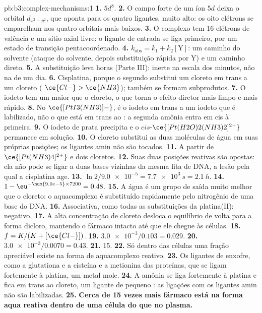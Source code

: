 \begin{solution}{pb:b3:complex-mechanisms:1}
\textbf{1.} $5d^8$.
\textbf{2.} O campo forte de um íon $5d$ deixa o orbital $d_{x^2-y^2}$, que aponta para os quatro
ligantes, muito alto: os oito elétrons se emparelham nos quatro orbitais mais baixos.
\textbf{3.} O complexo tem 16 elétrons de valência e um sítio axial livre: o ligante de
entrada se liga primeiro, por um estado de transição pentacoordenado.
\textbf{4.} $k_{\mathrm{obs}} = k_1 + k_2[\mathrm Y]$: um caminho do solvente (ataque do solvente, depois substituição rápida por Y)
e um caminho direto.
\textbf{5.} A substituição leva horas (Parte III): inerte na escala dos minutos, não na de
um dia.
\textbf{6.} Cisplatina, porque o segundo  substitui um cloreto em trans a um cloreto
( $\ce{Cl-} > \ce{NH3}$); também se formam subprodutos.
\textbf{7.} O iodeto tem um  maior que o cloreto, o que torna o efeito
diretor mais limpo e mais rápido.
\textbf{8.} No $\ce{[PtI3(NH3)]-}$, é o iodeto em trans a um iodeto que é labilizado, não o que está em trans ao
: a segunda amônia entra em cis à primeira.
\textbf{9.} O iodeto de prata precipita e o $cis$-$\ce{[Pt(H2O)2(NH3)2]^{2+}}$ permanece em solução.
\textbf{10.} O cloreto substitui as duas moléculas de água em suas próprias posições; os
ligantes amin não são tocados.
\textbf{11.} A partir de $\ce{[Pt(NH3)4]^{2+}}$ e dois cloretos.
\textbf{12.} Suas duas posições reativas são opostas: ela não pode se ligar a duas
bases vizinhas da mesma fita de DNA, a lesão pela qual a cisplatina
age.
\textbf{13.} $\ln2/\num{9.0e-5} = \qty{7.7e3}{s} = \qty{2.1}{h}$.
\textbf{14.} $1 - \eu^{-\num{9.0e-5} \times 7200} = 0.48$.
\textbf{15.} A água é um grupo de saída muito melhor que o cloreto: o aquacomplexo é
substituído rapidamente pelo nitrogênio de uma base do DNA.
\textbf{16.} Associativa, como todas as substituições da platina(II): 
negativo.
\textbf{17.} A alta concentração de cloreto desloca o equilíbrio de volta para a
forma dicloro, mantendo o fármaco intacto até que ele chegue às células.
\textbf{18.} $f = K/(K + [\ce{Cl-}])$.
\textbf{19.} $\num{3.0e-3}/0.103 = 0.029$.
\textbf{20.} $\num{3.0e-3}/0.0070 = 0.43$.
\textbf{21.} 15.
\textbf{22.} Só dentro das células uma fração apreciável existe na forma de aquacomplexo
reativo.
\textbf{23.} Os ligantes de enxofre, como a glutationa e a cisteína e a metionina das
proteínas, que se ligam fortemente à platina, um metal mole.
\textbf{24.} A amônia se liga fortemente à platina e fica em trans ao cloreto, um ligante de
pequeno : as ligações com os ligantes amin não são labilizadas.
\textbf{25.} \textbf{Cerca de 15 vezes mais fármaco está na forma aqua reativa dentro de uma
célula do que no plasma.}
\end{solution}
